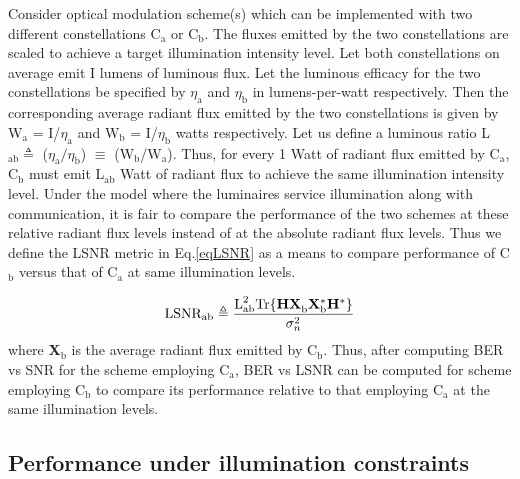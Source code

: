 \documentclass[10pt,letterpaper]{article}
\newcommand{\vm}[1]{{\bf{#1}}}
\begin{document}
Consider optical modulation scheme(s) which can be implemented with two different constellations C$_{\text{a}}$ or C$_{\text{b}}$. The fluxes emitted by the two constellations are scaled to achieve a target illumination intensity level. Let both constellations on average emit I lumens of luminous flux. Let the luminous efficacy for the two constellations be specified by $\eta_{\text{a}}$ and $\eta_{\text{b}}$ in lumens-per-watt respectively. Then the corresponding average radiant flux emitted by the two constellations is given by W$_{\text{a}}$ = I/$\eta_{\text{a}}$ and W$_{\text{b}}$  = I/$\eta_{\text{b}}$ watts respectively. Let us define a luminous ratio L$_{\text{ab}}\triangleq$ ($\eta_{\text{a}}/\eta_{\text{b}}$) $\equiv$ (W$_{\text{b}}$/W$_{\text{a}}$). Thus, for every 1 Watt of radiant flux emitted by C$_{\text{a}}$, C$_{\text{b}}$ must emit L$_{\text{ab}}$ Watt of radiant flux to achieve the same illumination intensity level. Under the model where the luminaires service illumination along with communication, it is fair to compare the performance of the two schemes at these relative radiant flux levels instead of at the absolute radiant flux levels. Thus we define the LSNR metric in Eq.\eqref{eqLSNR} as a means to compare performance of C$_{\text{b}}$ versus that of C$_{\text{a}}$ at same illumination levels. 

\begin{equation}
	\text{LSNR}_{\text{ab}} \triangleq \frac{\text{L}^{2}_{\text{ab}}\text{Tr}\{\vm{H}\vm{X}^{ }_{\text{b}}\vm{X}^{*}_{\text{b}}\vm{H}^{*}\}}{\sigma^{2}_{n}} 
	\label{eqLSNR}
\end{equation}
where \vm{X}$_{\text{b}}$ is the average radiant flux emitted by C$_{\text{b}}$. Thus, after computing BER vs SNR for the scheme employing C$_{\text{a}}$, BER vs LSNR can be computed for scheme employing C$_{\text{b}}$ to compare its performance relative to that employing C$_{\text{a}}$ at the same illumination levels.

\subsection{Performance under illumination constraints}\label{ssCSKLSNR}
\end{document}
